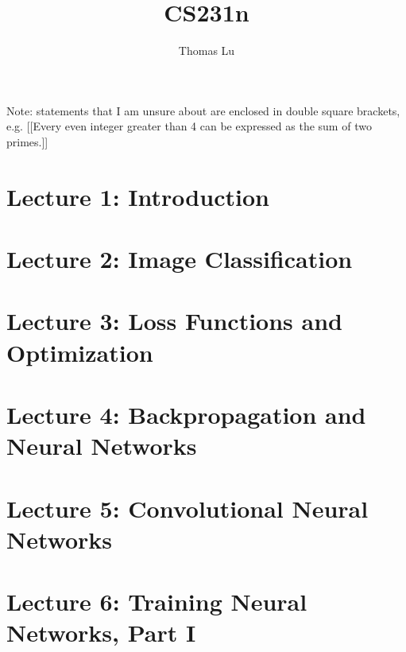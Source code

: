 \documentclass{article}
\title{CS231n}
\author{Thomas Lu}
\date{}
\begin{document}
\maketitle
Note: statements that I am unsure about are enclosed in double square brackets, e.g. [[Every even integer greater than 4 can be expressed as the sum of two primes.]]
\section{Lecture 1: Introduction}

\section{Lecture 2: Image Classification}

\section{Lecture 3: Loss Functions and Optimization}

\section{Lecture 4: Backpropagation and Neural Networks}

\section{Lecture 5: Convolutional Neural Networks}

\section{Lecture 6: Training Neural Networks, Part I}

\end{document}
